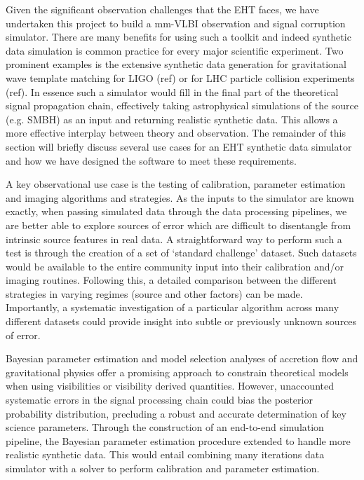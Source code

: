 Given the significant observation challenges that the EHT faces, we have undertaken this project to build a mm-VLBI observation and signal corruption simulator.  There are many benefits for using such a toolkit and indeed synthetic data simulation is common practice for every major scientific experiment. Two prominent examples is the  extensive synthetic data generation for gravitational wave template matching for LIGO (ref) or for LHC particle collision experiments (ref). In essence such a simulator would fill in the final part of the theoretical signal propagation chain, effectively taking  astrophysical simulations of the source (e.g. SMBH) as an input and returning realistic synthetic data. This allows a more effective interplay between theory and observation. The remainder of this section will briefly discuss several use cases for an EHT synthetic data simulator and how we have designed the software to meet these requirements. 


A key observational use case is the testing of calibration, parameter estimation and imaging algorithms and strategies. As the inputs to the simulator are known exactly, when passing simulated data through the data processing pipelines, we are better able to explore sources of error which are difficult to disentangle from intrinsic source features in real data.  A straightforward way to perform such a test is through the creation of a set of `standard challenge' dataset. Such datasets would be available to the entire community input into their calibration and/or imaging routines. Following this, a detailed comparison between the different strategies in varying regimes (source and other factors) can be made. Importantly, a systematic investigation of a particular algorithm across many different datasets could provide insight into subtle or previously unknown sources of error.

Bayesian parameter estimation and model selection analyses of accretion flow \citep[e.g.][]{Broderick_2016} and gravitational physics \citep[e.g.][]{Broderick_2014, Psaltis_2016} offer a promising approach to constrain theoretical models when using visibilities or visibility derived quantities. However, unaccounted systematic errors in the signal processing chain could bias  the posterior probability distribution, precluding a robust and accurate determination of key science parameters. Through the construction of an end-to-end simulation pipeline, the Bayesian parameter estimation procedure extended to handle more realistic synthetic data. This would entail combining many iterations data simulator with a solver to perform calibration and parameter estimation. %

